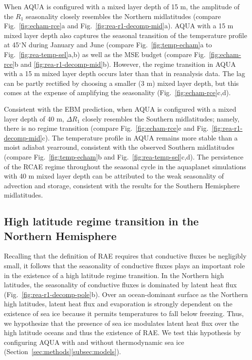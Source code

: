 \documentclass{ametsocV5}
\begin{document}
  When AQUA is configured with a mixed layer depth of 15 m, the amplitude of the \(R_{1}\) seasonality closely resembles the Northern midlatitudes (compare Fig.~\ref{fig:echam-rce}a and Fig.~\ref{fig:rea-r1-decomp-mid}a). AQUA with a 15 m mixed layer depth also captures the seasonal transition of the temperature profile at 45$^\circ$N during January and June (compare Fig.~\ref{fig:temp-echam}a to Fig.~\ref{fig:rea-temp-sel}a,b) as well as the MSE budget (compare Fig.~\ref{fig:echam-rce}b and \ref{fig:rea-r1-decomp-mid}b). However, the regime transition in AQUA with a 15 m mixed layer depth occurs later than that in reanalysis data. The lag can be partly rectified by choosing a smaller (3 m) mixed layer depth, but this comes at the expense of amplifying the seasonality (Fig.~\ref{fig:echam-rce}c,d).
  
  Consistent with the EBM prediction, when AQUA is configured with a mixed layer depth of 40 m, \(\Delta R_{1}\)  closely resembles the Southern midlatitudes; namely, there is no regime transition (compare Fig.~\ref{fig:echam-rce}e and Fig.~\ref{fig:rea-r1-decomp-mid}c). The temperature profile in AQUA remains more stable than a moist adiabat yearround, consistent with the observed Southern midlatitudes (compare Fig.~\ref{fig:temp-echam}b and Fig.~\ref{fig:rea-temp-sel}c,d). The persistence of the RCAE regime throughout the seasonal cycle in the aquaplanet simulations with 40 m mixed layer depth can be attributed to the weak seasonality of advection and storage, consistent with the results for the Southern Hemisphere midlatitudes.
  
  
  \subsection{High latitude regime transition in the Northern Hemisphere} \label{subsec:ice}

  Recalling that the definition of RAE requires that conductive fluxes be negligibly small, it follows that the seasonality of conductive fluxes plays an important role in the existence of a high latitude regime transition. In the Northern high latitudes, the seasonality of conductive fluxes is dominated by latent heat flux (Fig.~\ref{fig:rea-r1-decomp-pole}b). Over an ocean-dominant surface as the Northern high latitudes, latent heat flux and evaporation is strongly dependent on the existence of sea ice because it permits temperatures to fall below freezing.
  Thus, we hypothesize that the presence of sea ice modulates latent heat flux over the high latitude oceans and thus the existence of RAE. We test this hypothesis by configuring AQUA with and without thermodynamic sea ice (Section~\ref{sec:methods}\ref{subsec:models}). 
\end{document}
